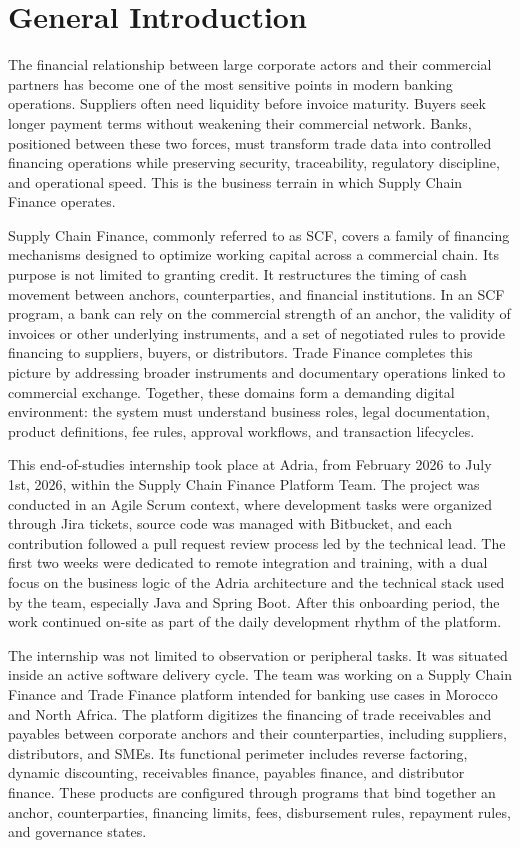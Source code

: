\chapter*{General Introduction}

The financial relationship between large corporate actors and their commercial partners has become one of the most sensitive points in modern banking operations. Suppliers often need liquidity before invoice maturity. Buyers seek longer payment terms without weakening their commercial network. Banks, positioned between these two forces, must transform trade data into controlled financing operations while preserving security, traceability, regulatory discipline, and operational speed. This is the business terrain in which Supply Chain Finance operates.

Supply Chain Finance, commonly referred to as SCF, covers a family of financing mechanisms designed to optimize working capital across a commercial chain. Its purpose is not limited to granting credit. It restructures the timing of cash movement between anchors, counterparties, and financial institutions. In an SCF program, a bank can rely on the commercial strength of an anchor, the validity of invoices or other underlying instruments, and a set of negotiated rules to provide financing to suppliers, buyers, or distributors. Trade Finance completes this picture by addressing broader instruments and documentary operations linked to commercial exchange. Together, these domains form a demanding digital environment: the system must understand business roles, legal documentation, product definitions, fee rules, approval workflows, and transaction lifecycles.

This end-of-studies internship took place at Adria, from February 2026 to July 1st, 2026, within the Supply Chain Finance Platform Team. The project was conducted in an Agile Scrum context, where development tasks were organized through Jira tickets, source code was managed with Bitbucket, and each contribution followed a pull request review process led by the technical lead. The first two weeks were dedicated to remote integration and training, with a dual focus on the business logic of the Adria architecture and the technical stack used by the team, especially Java and Spring Boot. After this onboarding period, the work continued on-site as part of the daily development rhythm of the platform.

The internship was not limited to observation or peripheral tasks. It was situated inside an active software delivery cycle. The team was working on a Supply Chain Finance and Trade Finance platform intended for banking use cases in Morocco and North Africa. The platform digitizes the financing of trade receivables and payables between corporate anchors and their counterparties, including suppliers, distributors, and SMEs. Its functional perimeter includes reverse factoring, dynamic discounting, receivables finance, payables finance, and distributor finance. These products are configured through programs that bind together an anchor, counterparties, financing limits, fees, disbursement rules, repayment rules, and governance states.

